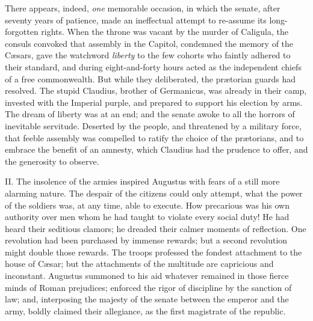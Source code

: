 
There appears, indeed, \textit{one} memorable occasion, in which the
senate, after seventy years of patience, made an ineffectual
attempt to re-assume its long-forgotten rights. When the throne
was vacant by the murder of Caligula, the consuls convoked that
assembly in the Capitol, condemned the memory of the Cæsars, gave
the watchword \textit{liberty} to the few cohorts who faintly adhered to
their standard, and during eight-and-forty hours acted as the
independent chiefs of a free commonwealth. But while they
deliberated, the prætorian guards had resolved. The stupid
Claudius, brother of Germanicus, was already in their camp,
invested with the Imperial purple, and prepared to support his
election by arms. The dream of liberty was at an end; and the
senate awoke to all the horrors of inevitable servitude. Deserted
by the people, and threatened by a military force, that feeble
assembly was compelled to ratify the choice of the prætorians,
and to embrace the benefit of an amnesty, which Claudius had the
prudence to offer, and the generosity to observe.\footnotemark[28]


II. The insolence of the armies inspired Augustus with fears of a
still more alarming nature. The despair of the citizens could
only attempt, what the power of the soldiers was, at any time,
able to execute. How precarious was his own authority over men
whom he had taught to violate every social duty! He had heard
their seditious clamors; he dreaded their calmer moments of
reflection. One revolution had been purchased by immense rewards;
but a second revolution might double those rewards. The troops
professed the fondest attachment to the house of Cæsar; but the
attachments of the multitude are capricious and inconstant.
Augustus summoned to his aid whatever remained in those fierce
minds of Roman prejudices; enforced the rigor of discipline by
the sanction of law; and, interposing the majesty of the senate
between the emperor and the army, boldly claimed their
allegiance, as the first magistrate of the republic.

